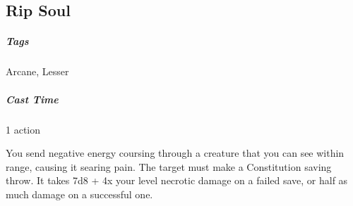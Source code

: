 











\subsection{Rip Soul}
\subparagraph*{Tags} Arcane, Lesser
\subparagraph*{Cast Time} 1 action

You send negative energy coursing through a creature that you can see within range, causing it searing pain. The target must make a Constitution saving throw. It takes 7d8 + 4x your level necrotic damage on a failed save, or half as much damage on a successful one.

